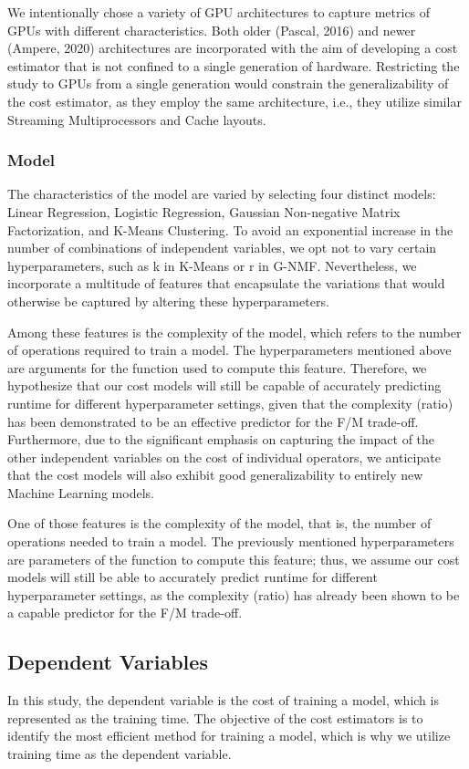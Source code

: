 We intentionally chose a variety of GPU architectures to capture metrics of GPUs with different characteristics. Both older (Pascal, 2016) and newer (Ampere, 2020) architectures are incorporated with the aim of developing a cost estimator that is not confined to a single generation of hardware. Restricting the study to GPUs from a single generation would constrain the generalizability of the cost estimator, as they employ the same architecture, i.e., they utilize similar Streaming Multiprocessors and Cache layouts.

\subsubsection{Model}
The characteristics of the model are varied by selecting four distinct models: Linear Regression, Logistic Regression, Gaussian Non-negative Matrix Factorization, and K-Means Clustering. To avoid an exponential increase in the number of combinations of independent variables, we opt not to vary certain hyperparameters, such as k in K-Means or r in G-NMF. Nevertheless, we incorporate a multitude of features that encapsulate the variations that would otherwise be captured by altering these hyperparameters.

Among these features is the complexity of the model, which refers to the number of operations required to train a model. The hyperparameters mentioned above are arguments for the function used to compute this feature. Therefore, we hypothesize that our cost models will still be capable of accurately predicting runtime for different hyperparameter settings, given that the complexity (ratio) has been demonstrated to be an effective predictor for the F/M trade-off. Furthermore, due to the significant emphasis on capturing the impact of the other independent variables on the cost of individual operators, we anticipate that the cost models will also exhibit good generalizability to entirely new Machine Learning models.

One of those features is the complexity of the model, that is, the number of operations needed to train a model. The previously mentioned hyperparameters are parameters of the function to compute this feature; thus, we assume our cost models will still be able to accurately predict runtime for different hyperparameter settings, as the complexity (ratio) has already been shown to be a capable predictor for the F/M trade-off.

\subsection{Dependent Variables}
In this study, the dependent variable is the cost of training a model, which is represented as the training time. The objective of the cost estimators is to identify the most efficient method for training a model, which is why we utilize training time as the dependent variable.

